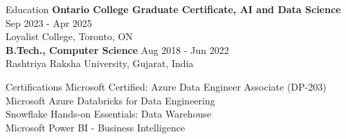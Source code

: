 \documentclass{resume}
\begin{document}
\begin{rSection}{Education}
\vspace{0.4em}
\textbf{Ontario College Graduate Certificate, AI and Data Science} \hfill Sep 2023 - Apr 2025 \\
Loyalist College, Toronto, ON \\
\textbf{B.Tech., Computer Science} \hfill Aug 2018 - Jun 2022 \\
Rashtriya Raksha University, Gujarat, India
\end{rSection}

\begin{rSection}{Certifications}
\vspace{0.4em}
Microsoft Certified: Azure Data Engineer Associate (DP-203) \\
Microsoft Azure Databricks for Data Engineering \\
Snowflake Hands-on Essentials: Data Warehouse \\
Microsoft Power BI - Business Intelligence
\end{rSection}
\end{document}
